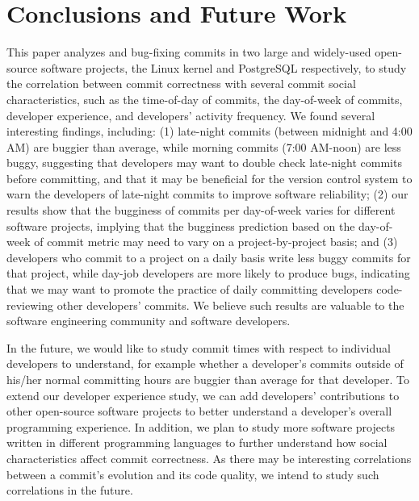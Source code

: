\section{Conclusions and Future Work}
\label{sec-conclusion}

This paper analyzes \linuxBFC and \postBFC bug-fixing commits in two large and widely-used open-source software projects, 
the Linux kernel and PostgreSQL respectively, to study the correlation between commit correctness with 
several commit social characteristics, such as the time-of-day of commits,
the day-of-week of commits, developer experience, and developers' activity
frequency. We found several interesting findings, including: (1)  
late-night commits (between midnight and 4:00 AM) are buggier than average, 
while morning commits (7:00 AM-noon) are less buggy, suggesting 
that developers may want to double check late-night commits before committing, 
and that it may be beneficial for the version control
system to warn the developers of late-night commits to improve software reliability; 
(2) 
our results show that the bugginess of commits per day-of-week
varies for different software projects, 
implying that the bugginess prediction based on the day-of-week of commit metric 
may need to vary on a project-by-project basis;
and (3) developers who commit to a project on a daily basis
write less buggy commits for that project, while day-job developers are more likely to produce
bugs, indicating that we may
want to promote the practice of daily committing developers code-reviewing other
developers' commits.
We believe such results are valuable to the software engineering community and 
software developers. 

In the future, we would like to study commit times with respect to individual developers to 
understand, for example whether a developer's commits outside of his/her normal committing hours are buggier than average for that developer.
To extend our developer experience study, we can add developers' contributions to other open-source software projects
to better understand a developer's overall programming experience. 
In addition, we plan to study more software projects written in different programming languages
to further understand how social characteristics affect commit correctness. 
As there may be interesting correlations between a commit's evolution and its code quality,
we intend to study such correlations in the future.



